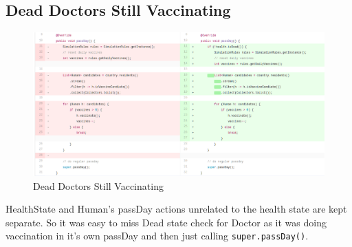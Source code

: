 \documentclass[]{article}
\begin{document}
\subsection{Dead Doctors Still
Vaccinating}\label{dead-doctors-still-vaccinating}

\begin{figure}[H]
\centering
\includegraphics{doc/deaddoctor.png}
\caption{Dead Doctors Still Vaccinating}
\end{figure}

HealthState and Human's passDay actions unrelated to the health state
are kept separate. So it was easy to miss Dead state check for Doctor as
it was doing vaccination in it's own passDay and then just calling
\texttt{super.passDay()}.
\end{document}
